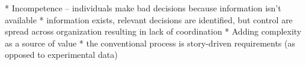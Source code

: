 

* Incompetence -- individuals make bad decisions because information isn't available
* information exists, relevant decisions are identified, but control are spread across organization resulting in lack of coordination
* Adding complexity as a source of value
* the conventional process is story-driven requirements (as opposed to experimental data)



